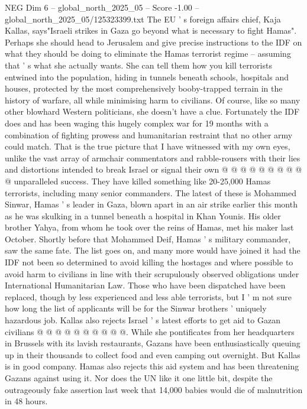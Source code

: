 \begin{textsample}{NEG Dim 6 – global\_north\_2025\_05 – Score -1.00 – global\_north\_2025\_05/125323399.txt}  \label{ex:f6_neg_407}
The EU ' s foreign affairs chief, Kaja Kallas, says"Israeli strikes in Gaza go beyond what is necessary to fight Hamas".
Perhaps she should head to Jerusalem and give precise instructions to the IDF on what they should be doing to eliminate the Hamas terrorist regime -- assuming that ' s what she actually wants.
She can tell them how you kill terrorists entwined into the population, hiding in tunnels beneath schools, hospitals and houses, protected by the most comprehensively booby-trapped terrain in the history of warfare, all while minimising harm to civilians.
Of course, like so many other blowhard Western politicians, she doesn't have a clue.
Fortunately the IDF does and has been waging this hugely complex war for 19 months with a combination of fighting prowess and humanitarian restraint that no other army could match.
That is the true picture that I have witnessed with my own eyes, unlike the vast array of armchair commentators and rabble-rousers with their lies and distortions intended to break Israel or signal their own @ @ @ @ @ @ @ @ @ @ unparalleled success.
They have killed something like 20-25,000 Hamas terrorists, including many senior commanders.
The latest of these is Mohammed Sinwar, Hamas ' s leader in Gaza, blown apart in an air strike earlier this month as he was skulking in a tunnel beneath a hospital in Khan Younis.
His older brother Yahya, from whom he took over the reins of Hamas, met his maker last October.
Shortly before that Mohammed Deif, Hamas ' s military commander, saw the same fate.
The list goes on, and many more would have joined it had the IDF not been so determined to avoid killing the hostages and where possible to avoid harm to civilians in line with their scrupulously observed obligations under International Humanitarian Law.
Those who have been dispatched have been replaced, though by less experienced and less able terrorists, but I ' m not sure how long the list of applicants will be for the Sinwar brothers ' uniquely hazardous job.
Kallas also rejects Israel ' s latest efforts to get aid to Gazan civilians @ @ @ @ @ @ @ @ @ @.
While she pontificates from her headquarters in Brussels with its lavish restaurants, Gazans have been enthusiastically queuing up in their thousands to collect food and even camping out overnight.
But Kallas is in good company.
Hamas also rejects this aid system and has been threatening Gazans against using it.
Nor does the UN like it one little bit, despite the outrageously fake assertion last week that 14,000 babies would die of malnutrition in 48 hours.

\end{textsample}
